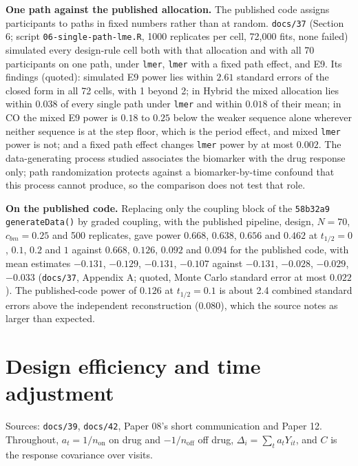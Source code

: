 \documentclass[11pt]{article}
\newcommand{\code}[1]{\texttt{#1}}
\begin{document}
\textbf{One path against the published allocation.} The published
code assigns participants to paths in fixed numbers rather than at
random. \code{docs/37} (Section 6; script \code{06-single-path-lme.R},
1000 replicates per cell, 72{,}000 fits, none failed) simulated every
design-rule cell both with that allocation and with all 70 participants
on one path, under \code{lmer}, \code{lmer} with a fixed path effect,
and E9. Its findings (quoted): simulated E9 power lies within $2.61$
standard errors of the closed form in all 72 cells, with 1 beyond 2;
in Hybrid the mixed allocation lies within $0.038$ of every single path
under \code{lmer} and within $0.018$ of their mean; in CO the mixed E9
power is $0.18$ to $0.25$ below the weaker sequence alone wherever
neither sequence is at the step floor, which is the period effect, and
mixed \code{lmer} power is not; and a fixed path effect changes
\code{lmer} power by at most $0.002$. The data-generating process
studied associates the biomarker with the drug response only; path
randomization protects against a biomarker-by-time confound that this
process cannot produce, so the comparison does not test that role.

\textbf{On the published code.} Replacing only the coupling block of
the \code{58b32a9} \code{generateData()} by graded coupling, with the
published pipeline, design, $N = 70$, $c_{bm} = 0.25$ and 500
replicates, gave power $0.668$, $0.638$, $0.656$ and $0.462$ at
$t_{1/2} = 0$, $0.1$, $0.2$ and $1$ against $0.668$, $0.126$, $0.092$
and $0.094$ for the published code, with mean estimates $-0.131$,
$-0.129$, $-0.131$, $-0.107$ against $-0.131$, $-0.028$, $-0.029$,
$-0.033$ (\code{docs/37}, Appendix A; quoted, Monte Carlo standard
error at most $0.022$). The published-code power of $0.126$ at
$t_{1/2} = 0.1$ is about 2.4 combined standard errors above the
independent reconstruction ($0.080$), which the source notes as larger
than expected.

\section{Design efficiency and time adjustment}
\label{sec:bp-design}

Sources: \code{docs/39}, \code{docs/42}, Paper 08's short
communication and Paper 12. Throughout, $a_t =
1/n_{\text{on}}$ on drug and $-1/n_{\text{off}}$ off drug, $\Delta_i =
\sum_t a_t Y_{it}$, and $C$ is the response covariance over visits.
\end{document}

